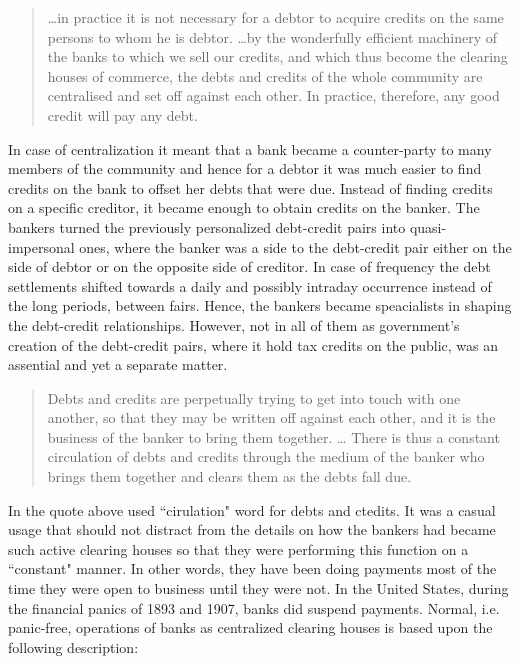 \begin{quote}
\dots in practice it is not necessary for a
 debtor to acquire credits on the same persons to whom he is debtor. \dots by the wonderfully efficient machinery of the banks to which we sell our credits, and which thus
 become the clearing houses of commerce, the debts and credits of the
 whole community are centralised and set off against each other. In
 practice, therefore, any good credit will pay any debt.~\citep[p.~152]{innes1914}
\end{quote}

In case of centralization it meant that a bank became a counter-party to many members of the community and hence for a debtor it was much easier to find credits on the bank to offset her debts that were due. Instead of finding credits on a specific creditor, it became enough to obtain credits on the banker. The bankers turned the previously personalized debt-credit pairs into quasi-impersonal ones, where the banker was a side to the debt-credit pair either on the side of debtor or on the opposite side of creditor. In case of frequency the debt settlements shifted towards a daily and possibly intraday occurrence instead of the long periods, between fairs. Hence, the bankers became speacialists in shaping the debt-credit relationships. However, not in all of them as government's creation of the debt-credit pairs, where it hold tax credits on the public, was an assential and yet a separate matter.

\begin{quote}
Debts and credits are perpetually trying to get into touch with one
 another, so that they may be written off against each other, and it is the
 business of the banker to bring them together. \dots
There is thus a constant circulation of debts and credits through the
 medium of the banker who brings them together and clears them as the
 debts fall due.~\citep[pp.~402-403]{innes1913} 
\end{quote}

In the quote above \citeauthor{innes1913} used ``cirulation" word for debts and ctedits. It was a casual usage that should not distract from the details on how the bankers had became such active clearing houses so that they were performing this function on a ``constant" manner. In other words, they have been doing payments most of the time they were open to business until they were not. In the United States, during the financial panics of 1893 and 1907, banks did suspend payments. Normal, i.e. panic-free, operations of banks as centralized clearing houses is based upon the following description:

